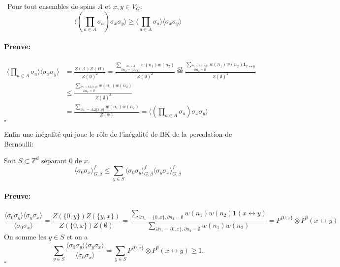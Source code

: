 \documentclass[a4paper,12pt]{report}
\newenvironment{preuve}{\paragraph{Preuve:}}{\hfill$\square$}
\begin{document}
\begin{prop}\
Pour tout ensembles de spins $A$ et $x,y \in V_G$:
$$
\langle (\prod_{a \in A} \sigma_a) \sigma_x \sigma_y \rangle \geq \langle \prod_{a \in A} \sigma_a \rangle \langle \sigma_x \sigma_y \rangle
$$
\end{prop}

\begin{preuve}
\begin{align*}
\langle \prod_{a \in A} \sigma_a \rangle \langle \sigma_x \sigma_y \rangle
&= \frac{Z(A) Z(B)}{Z(\emptyset)^2} 
= \frac{\sum_{\overset{\partial n_1 = A}{\partial n_2 = \{x,y\} }} w(n_1) w(n_2) }{Z(\emptyset)^2}
\overset{SL}{=} \frac{\sum_{\overset{\partial n_1 = A \Delta \{x,y\}}{\partial n_2 = \emptyset}} w(n_1) w(n_2) \mathbf{1}_{x \leftrightarrow y}}{Z(\emptyset)^2} \\
&\leq \frac{\sum_{\overset{\partial n_1 = A \Delta \{x,y\}}{\partial n_2 = \emptyset}} w(n_1) w(n_2)}{Z(\emptyset)^2} \\
&= \frac{\sum_{\partial n_1 = A \Delta \{x,y\}} w(n_1) w(n_2)}{Z(\emptyset)} = \langle (\prod_{a \in A} \sigma_a) \sigma_x \sigma_y \rangle 
\end{align*}
\end{preuve}


Enfin une inégalité qui joue le rôle de l'inégalité de BK de la percolation de Bernoulli:

\begin{prop}
Soit $S\subset \mathbb{Z}^d$ séparant $0$ de $x$.
$$\langle \sigma_0 \sigma_x \rangle_{G,\beta}^f \leqslant \sum_{y\in S}\langle \sigma_0 \sigma_y\rangle_{G,\beta}^f \langle \sigma_y \sigma_x\rangle_{G,\beta}^f
$$
\end{prop}

\begin{preuve}
$$\frac{\langle \sigma_0 \sigma_y \rangle\langle\sigma_y \sigma_x\rangle}{\langle \sigma_0 \sigma_x\rangle} = \frac{Z(\{0,y\})Z(\{y,x\})}{Z(\{0,x\})Z(\emptyset)} = \frac{\sum_{\partial n_1=\{0,x\},\partial n_2= \emptyset} w(n_1)w(n_2)\mathbf{1}(x\leftrightarrow y)}{\sum_{\partial n_1 = \{0,x\},\partial n_2 = \emptyset}w(n_1)w(n_2)} = P^{\{0,x\}}\otimes P^\emptyset(x\leftrightarrow y)
$$
On somme les $y\in S$ et on a 
$$\sum_{y\in S}\frac{\langle \sigma_0 \sigma_y \rangle\langle\sigma_y \sigma_x\rangle}{\langle \sigma_0 \sigma_x\rangle} = \sum_{y\in S}P^{\{0,x\}}\otimes P^\emptyset(x\leftrightarrow y) \geqslant 1.
$$
\end{preuve}
\newpage
\end{document}
